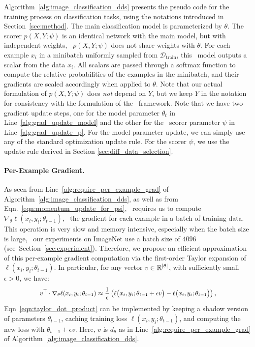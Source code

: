 Algorithm~\ref{alg:image_classification_dds} presents the pseudo code for the training process on classification tasks, using the notations introduced in Section~\ref{sec:method}. 
The main  classification model is parameterized by $\theta$. The scorer $p(X, Y; \psi)$ is an identical network with the main model, but with independent weights, \ie~$p(X, Y; \psi)$ does not share weights with $\theta$. For each example $x_i$ in a minibatch uniformly sampled from $\mathcal{D}_\text{train}$, this \dds~model outputs a scalar from the data $x_i$. All scalars are passed through a softmax function to compute the relative probabilities of the examples in the minibatch, and their gradients are scaled accordingly when applied to $\theta$. Note that our actual formulation of $p(X, Y; \psi)$ does \textit{not} depend on $Y$, but we keep $Y$ in the notation for consistency with the formulation of the \dds~framework. Note that we have two gradient update steps, one for the model parameter $\theta_t$ in Line~\ref{alg:grad_update_model} and the other for the \dds~scorer parameter $\psi$ in Line~\ref{alg:grad_update_p}. For the model parameter update, we can simply use any of the standard optimization update rule. For the scorer $\psi$, we use the update rule derived in Section \ref{sec:diff_data_selection}.

\paragraph{Per-Example Gradient.} As seen from Line~\ref{alg:require_per_example_grad} of Algorithm~\ref{alg:image_classification_dds}, as well as from Eqn.~\ref{eqn:momentum_update_for_psi}, \dds~requires us to compute $\nabla_\theta \ell(x_i, y_i; \theta_{t-1})$, \ie~the gradient for each example in a batch of training data. This operation is very slow and memory intensive, especially when the batch size is large, \eg~our experiments on ImageNet use a batch size of $4096$ (see~Section~\ref{sec:experiment}). Therefore, we propose an efficient approximation of this per-example gradient computation via the first-order Taylor expansion of $\ell(x_i, y_i; \theta_{t-1})$. In particular, for any vector $v \in \mathbb{R}^{\left| \theta \right|}$, with sufficiently small $\epsilon > 0$, we have:
    \vspace{-0.15cm}
\begin{equation}
  \label{eqn:taylor_dot_product}
  \small
  \begin{aligned}
    v^\top \cdot \nabla_\theta \ell(x_i, y_i; \theta_{t-1})
    \approx
    \frac{1}{\epsilon}
    \left(
      \ell\big( x_i, y_i; \theta_{t-1} + \epsilon v \big) -
      \ell\big( x_i, y_i; \theta_{t-1} \big)
    \right),
  \end{aligned}
\end{equation}
Eqn~\ref{eqn:taylor_dot_product} can be implemented by keeping a shadow version of parameters $\theta_{t-1}$, caching training loss $\ell(x_i, y_i; \theta_{t-1})$, and computing the new loss with $\theta_{t-1} + \epsilon v$. Here, $v$ is $d_\theta$ as in Line~\ref{alg:require_per_example_grad} of Algorithm~\ref{alg:image_classification_dds}.
